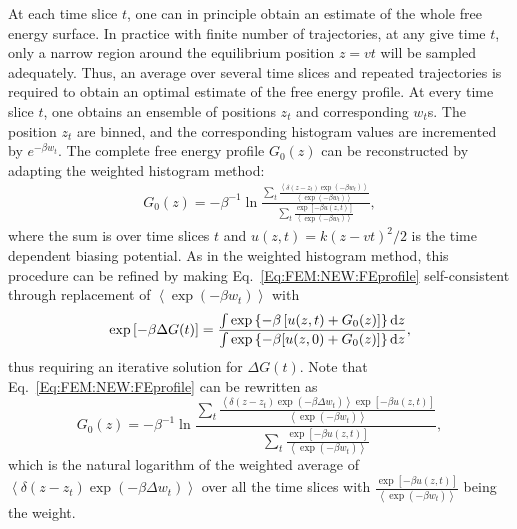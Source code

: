 At each time slice $t$, one can in principle obtain an estimate of the whole free energy surface. In practice with finite number of trajectories, at any give time $t$, only a narrow region around the equilibrium position $z=vt$ will be sampled adequately. Thus, an average over several time slices and repeated trajectories is required to obtain an optimal estimate of the free energy profile. At every time slice $t$, one obtains an ensemble of positions $z_t$ and corresponding $w_t$s. The position $z_t$ are binned, and the corresponding histogram values are incremented by $e^{-\beta w_t}$. The complete free energy profile $G_0(z)$ can be reconstructed by adapting the weighted histogram method:
\begin{align}
	G_0(z)=-\beta^{-1}\ln{\frac{\sum_t \frac{\left<\delta(z-z_t)\exp{(-\beta w_t)}\right>}{\left<\exp{(-\beta w_t)}\right>}}{\sum_t\frac{\exp{[-\beta u(z,t)]}}{\left<\exp{(-\beta w_t)}\right>}}},
	\label{Eq:FEM:NEW:FEprofile}
\end{align}
where the sum is over time slices $t$ and $u(z,t)=k(z-vt)^2/2$ is the time dependent biasing potential. As in the weighted histogram method, this procedure can be refined by making Eq.~\ref{Eq:FEM:NEW:FEprofile} self-consistent through replacement of $\left<\exp{(-\beta w_t)}\right>$ with
\begin{equation}
	\exp{[-\beta \Delta G(t)]}=\frac{\int \exp{\left\{-\beta \left[u(z,t)+G_0(z)\right]\right\}}\mathop{}\!\mathrm{d} z}{\int \exp{\left\{-\beta[u(z,0)+G_0(z)]\right\}\mathop{}\!\mathrm{d}z}},
\end{equation}
thus requiring an iterative solution for $\Delta G(t)$. Note that Eq.~\ref{Eq:FEM:NEW:FEprofile} can be rewritten as
\begin{equation}
	G_0(z)=-\beta^{-1}\ln{\frac{\sum_t \frac{\left<\delta(z-z_t)\exp{(-\beta \Delta w_t)}\right>\exp{[-\beta u(z,t)]}}{\left<\exp{(-\beta w_t)}\right>}}{\sum_t\frac{\exp{[-\beta u(z,t)]}}{\left<\exp{(-\beta w_t)}\right>}}},
\end{equation}
which is the natural logarithm of the weighted average of $\left<\delta(z-z_t)\exp{(-\beta \Delta w_t)}\right>$ over all the time slices with $\frac{\exp{[-\beta u(z,t)]}}{\left<\exp{(-\beta w_t)}\right>}$ being the weight.
